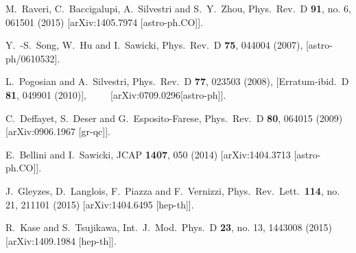 \documentclass[prd,nofootinbib,showpacs]{revtex4}
\begin{document}
{\begin{thebibliography}{999}
  M.~Raveri, C.~Baccigalupi, A.~Silvestri and S.~Y.~Zhou,
  Phys.\ Rev.\ D {\bf 91}, no. 6, 061501 (2015)
  [arXiv:1405.7974 [astro-ph.CO]].
  
  Y.~-S.~Song, W.~Hu and I.~Sawicki,
  Phys.\ Rev.\ D {\bf 75}, 044004 (2007),
  [astro-ph/0610532].
  
  L.~Pogosian and A.~Silvestri,
  Phys.\ Rev.\ D {\bf 77}, 023503 (2008),
  [Erratum-ibid.\ D {\bf 81}, 049901 (2010)],\,\,\,\,\,\,\,\,\,\,\,\,\,
  [arXiv:0709.0296[astro-ph]].
	


  C.~Deffayet, S.~Deser and G.~Esposito-Farese,
  Phys.\ Rev.\ D {\bf 80}, 064015 (2009)
  [arXiv:0906.1967 [gr-qc]].

  E.~Bellini and I.~Sawicki,
  JCAP {\bf 1407}, 050 (2014)
  [arXiv:1404.3713 [astro-ph.CO]].
	
  J.~Gleyzes, D.~Langlois, F.~Piazza and F.~Vernizzi,
  Phys.\ Rev.\ Lett.\  {\bf 114}, no. 21, 211101 (2015)
  [arXiv:1404.6495 [hep-th]].
	
  R.~Kase and S.~Tsujikawa,
  Int.\ J.\ Mod.\ Phys.\ D {\bf 23}, no. 13, 1443008 (2015)
  [arXiv:1409.1984 [hep-th]].
	

\end{thebibliography}}
\end{document}
